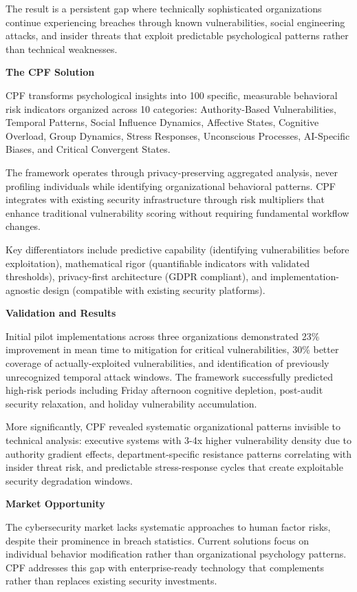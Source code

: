 \documentclass[11pt,a4paper]{article}
\begin{document}
The result is a persistent gap where technically sophisticated organizations continue experiencing breaches through known vulnerabilities, social engineering attacks, and insider threats that exploit predictable psychological patterns rather than technical weaknesses.

\textbf{The CPF Solution}

CPF transforms psychological insights into 100 specific, measurable behavioral risk indicators organized across 10 categories: Authority-Based Vulnerabilities, Temporal Patterns, Social Influence Dynamics, Affective States, Cognitive Overload, Group Dynamics, Stress Responses, Unconscious Processes, AI-Specific Biases, and Critical Convergent States.

The framework operates through privacy-preserving aggregated analysis, never profiling individuals while identifying organizational behavioral patterns. CPF integrates with existing security infrastructure through risk multipliers that enhance traditional vulnerability scoring without requiring fundamental workflow changes.

Key differentiators include predictive capability (identifying vulnerabilities before exploitation), mathematical rigor (quantifiable indicators with validated thresholds), privacy-first architecture (GDPR compliant), and implementation-agnostic design (compatible with existing security platforms).

\textbf{Validation and Results}

Initial pilot implementations across three organizations demonstrated 23\% improvement in mean time to mitigation for critical vulnerabilities, 30\% better coverage of actually-exploited vulnerabilities, and identification of previously unrecognized temporal attack windows. The framework successfully predicted high-risk periods including Friday afternoon cognitive depletion, post-audit security relaxation, and holiday vulnerability accumulation.

More significantly, CPF revealed systematic organizational patterns invisible to technical analysis: executive systems with 3-4x higher vulnerability density due to authority gradient effects, department-specific resistance patterns correlating with insider threat risk, and predictable stress-response cycles that create exploitable security degradation windows.

\textbf{Market Opportunity}

The cybersecurity market lacks systematic approaches to human factor risks, despite their prominence in breach statistics. Current solutions focus on individual behavior modification rather than organizational psychology patterns. CPF addresses this gap with enterprise-ready technology that complements rather than replaces existing security investments.
\end{document}
